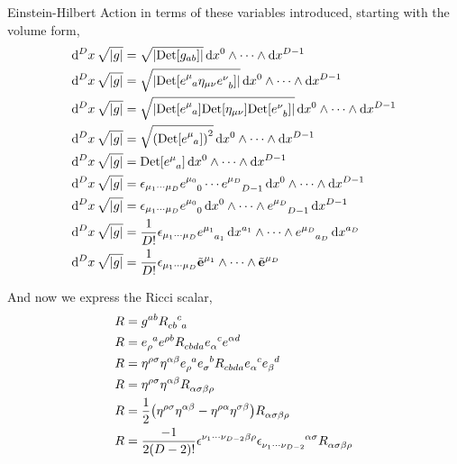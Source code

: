 Einstein-Hilbert Action in terms of these variables introduced, starting with the volume form,
\begin{align*}
    \dd[D]{x}\sqrt{\abs{g}}&=\sqrt{\abs{\Det\qty[g_{ab}]}}\dd{x^0}\wedge\cdots\wedge\dd{x^{D-1}}\\
    \dd[D]{x}\sqrt{\abs{g}}&=\sqrt{\abs{\Det\qty[\tensor{e}{^\mu_a}\eta_{\mu\nu}\tensor{e}{^\nu_b}]}}\dd{x^0}\wedge\cdots\wedge\dd{x^{D-1}}\\
    \dd[D]{x}\sqrt{\abs{g}}&=\sqrt{\abs{\Det\qty[\tensor{e}{^\mu_a}]\Det\qty[\eta_{\mu\nu}]\Det\qty[\tensor{e}{^\nu_b}]}}\dd{x^0}\wedge\cdots\wedge\dd{x^{D-1}}\\
    \dd[D]{x}\sqrt{\abs{g}}&=\sqrt{\qty(\Det\qty[\tensor{e}{^\mu_a}])^2}\dd{x^0}\wedge\cdots\wedge\dd{x^{D-1}}\\
    \dd[D]{x}\sqrt{\abs{g}}&=\Det\qty[\tensor{e}{^\mu_a}]\dd{x^0}\wedge\cdots\wedge\dd{x^{D-1}}\\
    \dd[D]{x}\sqrt{\abs{g}}&=\epsilon_{\mu_1\cdots\mu_{D}}\tensor{e}{^{\mu_0}_0}\cdots\tensor{e}{^{\mu_{D}}_{D-1}}\dd{x^0}\wedge\cdots\wedge\dd{x^{D-1}}\\
    \dd[D]{x}\sqrt{\abs{g}}&=\epsilon_{\mu_1\cdots\mu_{D}}\tensor{e}{^{\mu_0}_0}\dd{x^0}\wedge\cdots\wedge\tensor{e}{^{\mu_{D}}_{D-1}}\dd{x^{D-1}}\\
    \dd[D]{x}\sqrt{\abs{g}}&=\frac{1}{D!}\epsilon_{\mu_1\cdots\mu_{D}}\tensor{e}{^{\mu_1}_{a_1}}\dd{x^{a_1}}\wedge\cdots\wedge\tensor{e}{^{\mu_{D}}_{a_{D}}}\dd{x^{a_{D}}}\\
    \dd[D]{x}\sqrt{\abs{g}}&=\frac{1}{D!}\epsilon_{\mu_1\cdots\mu_{D}}\tilde{\vb e}^{\mu_1}\wedge\cdots\wedge\tilde{\vb e}^{\mu_{D}}
\end{align*}

And now we express the Ricci scalar,
\begin{align*}
    R&=g^{ab}\tensor{R}{_c_b^c_a}\\
    R&=\tensor{e}{_\rho^a}\tensor{e}{^\rho^b}\tensor{R}{_c_b_d_a}\tensor{e}{_\alpha^c}\tensor{e}{^\alpha^d}\\
    R&=\eta^{\rho\sigma}\eta^{\alpha\beta}\tensor{e}{_\rho^a}\tensor{e}{_\sigma^b}\tensor{R}{_c_b_d_a}\tensor{e}{_\alpha^c}\tensor{e}{_\beta^d}\\
    R&=\eta^{\rho\sigma}\eta^{\alpha\beta}\tensor{R}{_\alpha_\sigma_\beta_\rho}\\
    R&=\frac12\qty(\eta^{\rho\sigma}\eta^{\alpha\beta}-\eta^{\rho\alpha}\eta^{\sigma\beta})\tensor{R}{_\alpha_\sigma_\beta_\rho}\\
    R&=\frac{-1}{2\qty(D-2)!}\tensor{\epsilon}{^{\nu_1}^\cdots^{\nu_{D-2}}^\beta^\rho}\tensor{\epsilon}{_{\nu_1}_\cdots_{\nu_{D-2}}^\alpha^\sigma}\tensor{R}{_\alpha_\sigma_\beta_\rho}
\end{align*}

